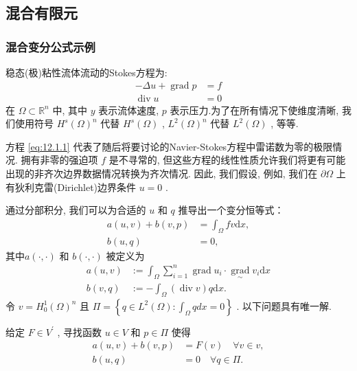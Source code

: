 \subsection{混合有限元}
\subsubsection{混合变分公式示例}
稳态(极)粘性流体流动的Stokes方程为:
\begin{equation}\label{eq:12.1.1}
\begin{aligned}
- {\Delta u} + \operatorname{grad}p &= f \\
\operatorname{div}{u} &= 0
\end{aligned}
\end{equation}
\qquad 在 $\Omega  \subset  {\mathbb{R}}^{n}$ 中, 其中 $y$ 表示流体速度, $p$ 表示压力.为了在所有情况下使维度清晰, 我们使用符号 ${H}^{s}{\left( \Omega \right) }^{n}$ 代替 ${H}^{s}\left( \Omega \right)$ , ${L}^{2}{\left( \Omega \right) }^{n}$ 代替 $L^{2}\left( \Omega \right)$ , 等等.\par
方程 \eqref{eq:12.1.1} 代表了随后将要讨论的Navier-Stokes方程中雷诺数为零的极限情况. 拥有非零的强迫项 $f$ 是不寻常的, 但这些方程的线性性质允许我们将更有可能出现的非齐次边界数据情况转换为齐次情况. 因此, 我们假设, 例如, 我们在 $\partial \Omega$ 上有狄利克雷(Dirichlet)边界条件 $u = 0$ .\par
通过分部积分, 我们可以为合适的 $u$ 和 $q$ 推导出一个变分恒等式：
    \begin{align}
        a\left( {u,v}\right)  + b\left( {v,p}\right)  &= \int_{\Omega }fv\mathrm{d}x,\label{eq:12.1.2}\\
        b\left( {u,q}\right)  &= 0,\label{eq:12.1.3}
    \end{align}
其中$a\left( {\cdot , \cdot  }\right)$ 和 $b\left( {\cdot , \cdot  }\right)$ 被定义为
    \begin{align}
        a\left( {u,v}\right)&:=\int_{\Omega }\sum\limits_{{i = 1}}^{n}\operatorname{grad}{u}_{i} \cdot  \mathop{\operatorname{grad}}\limits_{ \sim  }{v}_{i}\mathrm{d}x\label{eq:12.1.4}\\
        b\left( {v,q}\right)&:=- \int_{\Omega }\left( {\operatorname{div}v}\right) q\mathrm{d}x.\label{eq:12.1.5}
    \end{align}
令 $v = H^{1}_{0}{\left( \Omega \right) }^{n}$ 且 $\varPi  = \left\{  {q \in  {L}^{2}\left( \Omega \right)  : \int_{\Omega }{qdx} = 0}\right\}$ . 以下问题具有唯一解.\par
给定 $F \in  {V}^{\prime }$ , 寻找函数 $u \in  V$ 和 $p \in  \varPi$ 使得
\begin{equation}\label{eq:12.1.6}
\begin{aligned}
a\left( {u,v}\right)  + b\left( {v,p}\right)  &= F\left( v\right) \quad\forall v \in  v, \\
b\left( {u,q}\right)  &= 0\quad\forall q \in  \varPi .
\end{aligned}
\end{equation}

